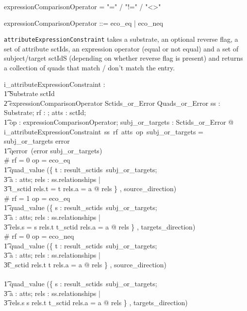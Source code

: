 \documentclass{article}
\def\spec#1{{\tt #1}}
\def\bnf#1{{\scriptsize {{#1}} }}
\begin{document}
 
\begin{framed}
\noindent
\bnf{expressionComparisonOperator = "=" / "!=" / "\textless\textgreater"}
\end{framed}
\begin{zed}
expressionComparisonOperator ::= eco\_eq | eco\_neq \\
\end{zed}

\spec{attributeExpressionConstraint} takes a substrate, an optional reverse flag, a set of attribute sctIds, an expression operator (equal or not equal) and a set of subject/target sctIdS (depending on 
whether reverse flag is present) and returns a collection of quads that match / don't match the entry.
\begin{gendef}
   i\_attributeExpressionConstraint : \\ 
\t1 Substrate \fun \optional[reverseFlag] \fun \power sctId \fun \\
\t2 expressionComparisonOperator \fun Sctids\_or\_Error \fun Quads\_or\_Error
\where
   \forall ss : Substrate;  rf : \optional[reverseFlag]; atts : \power sctId; \\
\t1 op : expressionComparisonOperator; subj\_or\_targets : Sctids\_or\_Error @ \\
   i\_attributeExpressionConstraint~ss~rf~atts~op~subj\_or\_targets = \\
 \IF subj\_or\_targets \in \ran error \\
\t1 \THEN qerror~(error \inv subj\_or\_targets) \\
 \ELSE \IF \# rf = 0 \land op = eco\_eq \THEN \\
\t1 quad\_value (\{ t : result\_sctids~subj\_or\_targets; \\
\t3 a : atts; rels : ss.relationships | \\
\t3 t\_sctid \inv rels.t = t \land rels.a = a @ rels \} , source\_direction) \\
\ELSE \IF \# rf = 1 \land op = eco\_eq \THEN \\
\t1 quad\_value (\{ s : result\_sctids~subj\_or\_targets; \\
\t3 a : atts; rels : ss.relationships | \\
\t3 rels.s = s \land rels.t \in \ran t\_sctid \land rels.a = a @ rels \} , targets\_direction) \\
 \ELSE \IF \# rf = 0 \land op = eco\_neq \THEN \\
\t1 quad\_value (\{ t : result\_sctids~subj\_or\_targets; \\
\t3 a : atts; rels : ss.relationships | \\
\t3t\_sctid \inv rels.t \neq t \land rels.a = a @ rels \} , source\_direction) \\
 \ELSE \\
\t1 quad\_value (\{ s : result\_sctids~subj\_or\_targets; \\
\t3 a : atts; rels : ss.relationships | \\
\t3 rels.s \neq s \land rels.t \in \ran t\_sctid \land rels.a = a @ rels \} , targets\_direction) 
\end{gendef}
\end{document}

